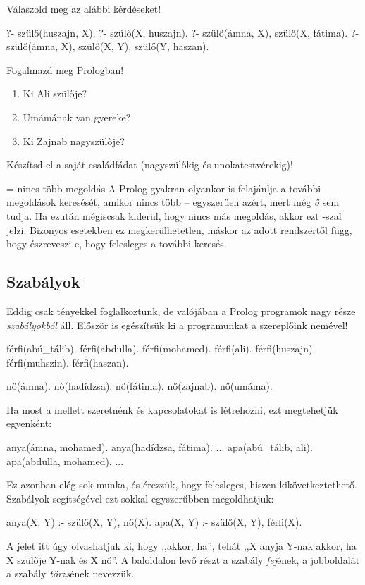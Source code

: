 \begin{problem}
Válaszold meg az alábbi kérdéseket!
\begin{query}
?- szülő(huszajn, X).
?- szülő(X, huszajn).
?- szülő(ámna, X), szülő(X, fátima).
?- szülő(ámna, X), szülő(X, Y), szülő(Y, haszan).
\end{query}
\end{problem}
\begin{problem}
Fogalmazd meg Prologban!
\begin{enumerate}
\item Ki Ali szülője?
\item Umámának van gyereke?
\item Ki Zajnab nagyszülője?
\end{enumerate}
\end{problem}
\begin{problem}
Készítsd el a saját családfádat (nagyszülőkig
és unokatestvérekig)!
\end{problem}

\begin{infobox*}{}{ = nincs több megoldás}
A Prolog gyakran olyankor is felajánlja a
további megoldások keresését, amikor nincs több --
egyszerűen azért, mert még \emph{ő} sem tudja.
Ha ezután mégiscsak kiderül, hogy nincs más
megoldás, akkor ezt -szal
jelzi. Bizonyos esetekben ez megkerülhetetlen,
máskor az adott rendszertől függ, hogy észreveszi-e,
hogy felesleges a további keresés.
\end{infobox*}

\subsection*{Szabályok}

Eddig csak tényekkel foglalkoztunk, de valójában a
Prolog programok nagy része \emph{szabályokból}
áll. Először is egészítsük ki a programunkat a
szereplőink nemével!

\begin{program}
férfi(abú_tálib).
férfi(abdulla).
férfi(mohamed).
férfi(ali).
férfi(huszajn).
férfi(muhszin).
férfi(haszan).

nő(ámna).
nő(hadídzsa).
nő(fátima).
nő(zajnab).
nő(umáma).
\end{program}

Ha most a  mellett szeretnénk  és
 kapcsolatokat is létrehozni, ezt
megtehetjük egyenként:
\begin{program}
anya(ámna, mohamed).
anya(hadídzsa, fátima).
...
apa(abú_tálib, ali).
apa(abdulla, mohamed).
...
\end{program}
Ez azonban elég sok munka, és érezzük, hogy
felesleges, hiszen kikövetkeztethető.  Szabályok
segítségével ezt sokkal egyszerűbben megoldhatjuk:
\begin{program}
anya(X, Y) :- szülő(X, Y), nő(X).
apa(X, Y) :- szülő(X, Y), férfi(X).
\end{program}
A \pr{:-} jelet itt úgy olvashatjuk ki, hogy
,,akkor, ha'', tehát ,,X anyja Y-nak akkor, ha X
szülője Y-nak és X nő''. A baloldalon levő részt a
szabály \emph{fej}\/ének, a jobboldalát a szabály
\emph{törzs}\/ének nevezzük.
\index{\pr{:-}}


